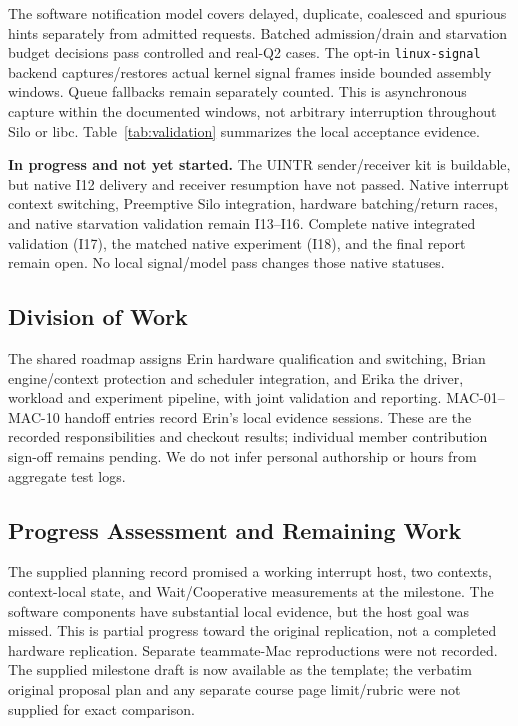 \documentclass[sigconf,nonacm]{acmart}
\newcommand{\minihead}[1]{{\vspace{.45em}\noindent\textbf{#1.} }}
\begin{document}
The software notification model covers delayed, duplicate, coalesced and
spurious hints separately from admitted requests. Batched admission/drain and
starvation budget decisions pass controlled and real-Q2 cases. The opt-in
\texttt{linux-signal} backend captures/restores actual kernel signal frames
inside bounded assembly windows. Queue fallbacks remain separately counted.
This is asynchronous capture within the documented windows, not arbitrary
interruption throughout Silo or libc. Table~\ref{tab:validation} summarizes
the local acceptance evidence.

\minihead{In progress and not yet started}
The UINTR sender/receiver kit is buildable, but native I12 delivery and
receiver resumption have not passed. Native interrupt context switching,
Preemptive Silo integration, hardware batching/return races, and native
starvation validation remain I13--I16. Complete native integrated validation
(I17), the matched native experiment (I18), and the final report remain open.
No local signal/model pass changes those native statuses.

\subsection{Division of Work}
The shared roadmap assigns Erin hardware qualification and switching, Brian
engine/context protection and scheduler integration, and Erika the driver,
workload and experiment pipeline, with joint validation and reporting.
MAC-01--MAC-10 handoff entries record Erin's local evidence sessions. These
are the recorded responsibilities and checkout results; individual member
contribution sign-off remains pending. We do not infer personal authorship
or hours from aggregate test logs.

\subsection{Progress Assessment and Remaining Work}
The supplied planning record promised a working interrupt host, two contexts,
context-local state, and Wait/Cooperative measurements at the milestone.
The software components have substantial local evidence, but the host goal
was missed. This is partial progress toward the original replication, not
a completed hardware replication. Separate teammate-Mac reproductions were
not recorded. The supplied milestone draft is now available as the template;
the verbatim original proposal plan and any separate course page limit/rubric
were not supplied for exact comparison.
\end{document}
